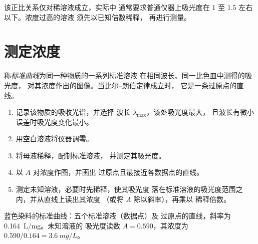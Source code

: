 \begin{remark}[仅适用于稀溶液]\label{rem:g11:absorbance:dilute}
该正比关系仅对稀溶液成立，实际中
通常要求普通仪器上吸光度在 1 至 1.5 左右以下。浓度过高的溶液
须先以已知倍数稀释，
再进行测量。
\end{remark}

\section{测定浓度}

\begin{definition}[标准曲线]\label{def:g11:absorbance:calibration-line}
称\emph{标准曲线}为同一种物质的一系列标准溶液
在相同波长、同一比色皿中测得的吸光度，
对其浓度作出的图像。当比尔–朗伯定律成立时，
它是一条过原点的直线。
\end{definition}

\begin{method}[用标准曲线测定浓度]\label{met:g11:absorbance:calibration}
\begin{enumerate}
  \item 记录该物质的吸收光谱，并选择
        波长 $\lambda_{\max}$，该处吸光度最大，
        且波长有微小误差时吸光度变化最小。
  \item 用空白溶液将仪器调零。
  \item 将母液稀释，配制标准溶液，
        并测定其吸光度。
  \item 以 $A$ 对浓度作图，并画出
        过原点且最接近各数据点的直线。
  \item 测定未知溶液，必要时先稀释，使其吸光度
        落在标准溶液的吸光度范围之内，并从直线上读出其浓度
        （或将 $A$ 除以斜率），再乘以
        稀释倍数。
\end{enumerate}
\end{method}

\begin{omfigure}

{\small 蓝色染料的标准曲线：五个标准溶液（数据点）及
过原点的直线，斜率为 \qty{0.164}{L/mg}。未知溶液的
吸光度读数 $A = 0.590$，其浓度为 $0.590 / 0.164 =
\qty{3.6}{mg/L}$。}
\end{omfigure}


